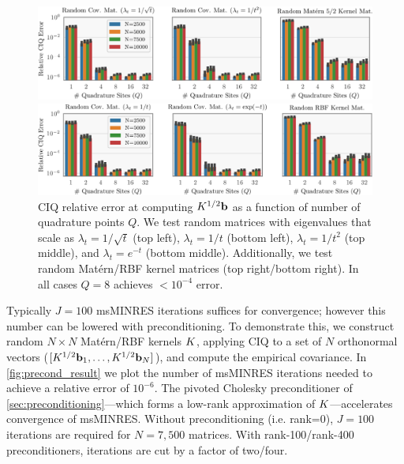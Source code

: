 \begin{figure}[t!]
	\centering
	\includegraphics[width=\textwidth]{figures/quad_error.pdf}

	\includegraphics[width=\textwidth]{figures/quad_error_supp.pdf}
  \caption[
    Relative error of CIQ as a function of number of quadrature points $Q$.
  ]{
    CIQ relative error at computing $K^{1/2} \mathbf{b}$ as a function of number of quadrature points $Q$.
    We test random matrices with eigenvalues that scale as $\lambda_t = 1/\sqrt{t}$ (top left), $\lambda_t = 1/t$ (bottom left), $\lambda_t = 1/{t}^2$ (top middle), and $\lambda_t = e^{-t}$ (bottom middle).
    Additionally, we test random Mat\'ern/RBF kernel matrices (top right/bottom right).
    In all cases $Q=8$ achieves $<10^{-4}$ error.
  }
  \label{fig:quad_error}
\end{figure}

Typically $J=100$ msMINRES iterations suffices for convergence; however this number can be lowered with preconditioning.
To demonstrate this, we construct  random $N \times N$ Mat\'ern/RBF kernels $K$, applying CIQ to a set of $N$ orthonormal vectors ($[K^{1/2} \mathbf{b}_{1}, \ldots, K^{1/2} \mathbf{b}_{N}]$), and compute the empirical covariance.
In \cref{fig:precond_result} we plot the number of msMINRES iterations needed to achieve a relative error of $10^{-6}$.
The pivoted Cholesky preconditioner of \cref{sec:preconditioning}---which forms a low-rank approximation of $K$---accelerates convergence of msMINRES.
Without preconditioning (i.e. rank=0), $J=100$ iterations are required for $N=7,\!500$ matrices.
With rank-100/rank-400 preconditioners, iterations are cut by a factor of two/four.

